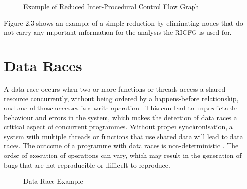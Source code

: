 \documentclass[
fancyheadings, %
%
%
]{stsreprt}
\begin{document}
{\begin{figure}[H]
	\caption{Example of Reduced Inter-Procedural Control Flow Graph}
\end{figure}

Figure 2.3 shows an example of a simple reduction by eliminating nodes that do not carry any important information for the analysis the RICFG is used for. 

\section{Data Races}

A data race occurs when two or more functions or threads access a shared resource concurrently, without being ordered by a happens-before relationship, and one of those accesses is a write operation \cite{chen2011}. This can lead to unpredictable behaviour and errors in the system, which makes the detection of data races a critical aspect of concurrent programmes.
Without proper synchronisation, a system with multiple threads or functions that use shared data will lead to data races. The outcome of a programme with data races is non-deterministic \cite{chen2011}. The order of execution of operations can vary, which may result in the generation of bugs that are not reproducible or difficult to reproduce. 
\begin{figure}[H]
	\centering
	\begin{algorithm}[H]
		\caption{Data Race Example}
		

\end{algorithm}
\end{figure}}
\end{document}
